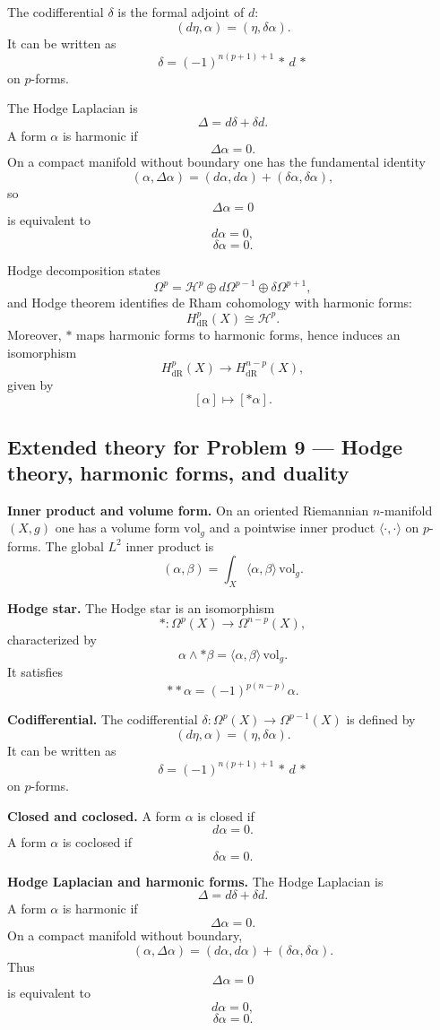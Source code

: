 \documentclass[12pt,a4paper]{article}
\theoremstyle{plain}
\theoremstyle{definition}      %
\begin{document}
The codifferential $\delta$ is the formal adjoint of $d$:
\[
(d\eta,\alpha)=(\eta,\delta\alpha).
\]
It can be written as
\[
\delta = (-1)^{n(p+1)+1}\,*\,d\,*
\]
on $p$-forms.

The Hodge Laplacian is
\[
\Delta=d\delta+\delta d.
\]
A form $\alpha$ is harmonic if
\[
\Delta\alpha=0.
\]
On a compact manifold without boundary one has the fundamental identity
\[
(\alpha,\Delta\alpha)=(d\alpha,d\alpha)+(\delta\alpha,\delta\alpha),
\]
so
\[
\Delta\alpha=0
\]
is equivalent to
\[
d\alpha=0,
\]
\[
\delta\alpha=0.
\]

Hodge decomposition states
\[
\Omega^p=\mathcal{H}^p\oplus d\Omega^{p-1}\oplus \delta\Omega^{p+1},
\]
and Hodge theorem identifies de Rham cohomology with harmonic forms:
\[
H^p_{\mathrm{dR}}(X)\cong \mathcal{H}^p.
\]
Moreover, $*$ maps harmonic forms to harmonic forms, hence induces an isomorphism
\[
H^p_{\mathrm{dR}}(X)\to H^{n-p}_{\mathrm{dR}}(X),
\]
given by
\[
[\alpha]\mapsto[*\alpha].
\]


\subsection*{Extended theory for Problem 9 — Hodge theory, harmonic forms, and duality}

\textbf{Inner product and volume form.}
On an oriented Riemannian $n$-manifold $(X,g)$ one has a volume form $\mathrm{vol}_g$ and a pointwise inner product $\langle\cdot,\cdot\rangle$ on $p$-forms.
The global $L^2$ inner product is
\[
(\alpha,\beta)=\int_X \langle \alpha,\beta\rangle\,\mathrm{vol}_g.
\]

\textbf{Hodge star.}
The Hodge star is an isomorphism
\[
*:\Omega^p(X)\to\Omega^{n-p}(X),
\]
characterized by
\[
\alpha\wedge *\beta=\langle \alpha,\beta\rangle\,\mathrm{vol}_g.
\]
It satisfies
\[
**\alpha = (-1)^{p(n-p)}\alpha.
\]

\textbf{Codifferential.}
The codifferential $\delta:\Omega^p(X)\to\Omega^{p-1}(X)$ is defined by
\[
(d\eta,\alpha)=(\eta,\delta\alpha).
\]
It can be written as
\[
\delta = (-1)^{n(p+1)+1}\,*\,d\,*
\]
on $p$-forms.

\textbf{Closed and coclosed.}
A form $\alpha$ is closed if
\[
d\alpha=0.
\]
A form $\alpha$ is coclosed if
\[
\delta\alpha=0.
\]

\textbf{Hodge Laplacian and harmonic forms.}
The Hodge Laplacian is
\[
\Delta=d\delta+\delta d.
\]
A form $\alpha$ is harmonic if
\[
\Delta\alpha=0.
\]
On a compact manifold without boundary,
\[
(\alpha,\Delta\alpha)=(d\alpha,d\alpha)+(\delta\alpha,\delta\alpha).
\]
Thus
\[
\Delta\alpha=0
\]
is equivalent to
\[
d\alpha=0,
\]
\[
\delta\alpha=0.
\]
\end{document}
